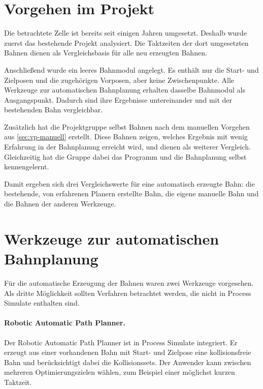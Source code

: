 \section{Vorgehen im Projekt}
\label{sec:vp-vorgehen}

Die betrachtete Zelle ist bereits seit einigen Jahren umgesetzt. Deshalb wurde zuerst das
bestehende Projekt analysiert. Die Taktzeiten der dort umgesetzten Bahnen dienen als
Vergleichsbasis für alle neu erzeugten Bahnen.

Anschließend wurde ein leeres Bahnmodul angelegt. Es enthält nur die Start- und Zielposen und
die zugehörigen Vorposen, aber keine Zwischenpunkte. Alle Werkzeuge zur automatischen
Bahnplanung erhalten dasselbe Bahnmodul als Ausgangspunkt. Dadurch sind ihre Ergebnisse
untereinander und mit der bestehenden Bahn vergleichbar.

Zusätzlich hat die Projektgruppe selbst Bahnen nach dem manuellen Vorgehen aus
\cref{sec:vp-manuell} erstellt. Diese Bahnen zeigen, welches Ergebnis mit wenig Erfahrung in
der Bahnplanung erreicht wird, und dienen als weiterer Vergleich. Gleichzeitig hat die Gruppe
dabei das Programm und die Bahnplanung selbst kennengelernt.

Damit ergeben sich drei Vergleichswerte für eine automatisch erzeugte Bahn: die bestehende,
von erfahrenen Planern erstellte Bahn, die eigene manuelle Bahn und die Bahnen der
anderen Werkzeuge.


\section{Werkzeuge zur automatischen Bahnplanung}
\label{sec:vp-werkzeuge}

Für die automatische Erzeugung der Bahnen waren zwei Werkzeuge vorgesehen. Als dritte
Möglichkeit sollten Verfahren betrachtet werden, die nicht in Process Simulate enthalten sind.

\paragraph{Robotic Automatic Path Planner.}
Der Robotic Automatic Path Planner ist in Process Simulate integriert. Er erzeugt aus einer
vorhandenen Bahn mit Start- und Zielpose eine kollisionsfreie Bahn und berücksichtigt dabei die
Kollisionssets. Der Anwender kann zwischen mehreren Optimierungszielen wählen, zum Beispiel
einer möglichst kurzen Taktzeit.


